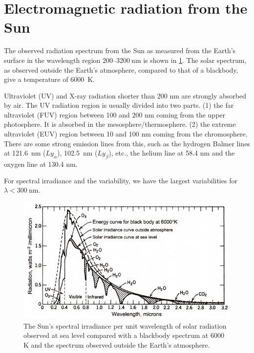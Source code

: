 \section{Electromagnetic radiation from the Sun}
The observed radiation spectrum from the Sun as measured from the Earth's surface in the wavelength region \(200\)--\(\SI{3200}{\nano\metre}\) is shown in \cref{fig:L9_sun_spectral_irradiance}. The solar spectrum, as observed outside the Earth's atmosphere, compared to that of a blackbody, give a temperature of \SI{6000}{\kelvin}.

Ultraviolet (UV) and X-ray radiation shorter than 200 nm are strongly absorbed by air. The UV radiation region is usually divided into two parts. (1) the far ultraviolet (FUV) region between 100 and 200 nm coming from the upper photosphere. It is absorbed in the mesosphere/thermosphere. (2) the extreme ultraviolet (EUV) region between 10 and 100 nm coming from the chromosphere. There are some strong emission lines from this, such as the hydrogen Balmer lines at \SI{121.6}{\nano\metre} (\(Ly_\alpha \)), \SI{102.5}{\nano\metre} (\(Ly_\beta \)), etc., the helium line at 58.4 nm and the oxygen line at 130.4 nm.

For spectral irradiance and the variability, we have the largest variabilities for \(\lambda <\SI{300}{\nano\metre}\).
\begin{figure}[t]
    \centering
    \includegraphics[width=.6\linewidth]{bilder/L9_sun_spectral_irradiance.png}
    \caption{The Sun's spectral irradiance per unit wavelength of solar radiation observed at sea level compared with a blackbody spectrum at \(\num{6000}\) K and the spectrum observed outside the Earth's atmosphere.}\label{fig:L9_sun_spectral_irradiance}
\end{figure}

